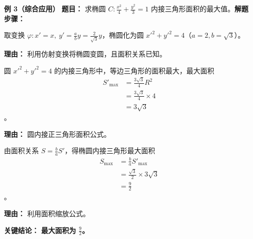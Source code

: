 \medskip
\begin{examplebox}
	\textbf{\textcolor{CExample}{例 3（综合应用）}}
	\textbf{\textcolor{CExample}{题目：}} 求椭圆 $C:\frac{x^2}{4}+\frac{y^2}{3}=1$ 内接三角形面积的最大值。\textbf{\textcolor{CExample}{解题步骤：}}
	\begin{description}[style=nextline, leftmargin=2.8em, labelsep=0.5em, itemsep=0.45em]
		\item[\textbf{第一步（作仿射变换）：}]
			取变换 $\varphi: x'=x,\ y'=\frac{a}{b}y=\frac{2}{\sqrt{3}}y$，椭圆化为圆 $x'^2+y'^2=4$（$a=2,b=\sqrt{3}$）。
			\par\textbf{理由：} 利用仿射变换将椭圆变圆，且面积关系已知。
		\item[\textbf{第二步（圆内接三角形最值）：}]
			圆 $x'^2+y'^2=4$ 的内接三角形中，等边三角形的面积最大，最大面积
			\[
				\begin{aligned}
					S'_{\max}&=\frac{3\sqrt{3}}{4}R^2 \\ &=\frac{3\sqrt{3}}{4}\times4 \\ &=3\sqrt{3}
			\end{aligned}
			\]
			。
			\par\textbf{理由：} 圆内接正三角形面积公式。
		\item[\textbf{第三步（反求椭圆内面积）：}]
			由面积关系 $S=\frac{b}{a}S'$，得椭圆内接三角形最大面积
			\[
				\begin{aligned}
					S_{\max}&=\frac{b}{a}S'_{\max} \\ &=\frac{\sqrt{3}}{2}\times3\sqrt{3} \\ &=\frac{9}{2}
			\end{aligned}
			\]
			。
			\par\textbf{理由：} 利用面积缩放公式。
	\end{description}
	\textbf{\textcolor{CExample}{关键结论：}}
	\textbf{最大面积为 $\frac{9}{2}$。}
\end{examplebox}

